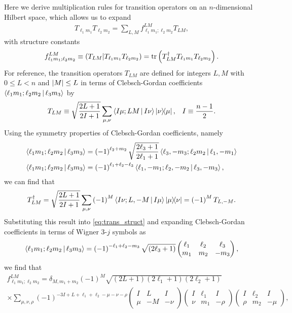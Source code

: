 \documentclass[nofootinbib,notitlepage,11pt]{revtex4-2}
\newcommand{\f}[2]{\dfrac{#1}{#2}} %
\newcommand{\p}[1]{\left(#1\right)} %
\newcommand{\bk}{\Braket} %
\newcommand{\1}{\mathds{1}}
\def\obk#1{\mathinner{({#1})}}
\begin{document}
Here we derive multiplication rules for transition operators on an $n$-dimensional Hilbert space, which allows us to expand
\begin{align}
  T_{\ell_1 m_1} T_{\ell_2 m_2}
  = \sum_{L,M} f_{\ell_1 m_1;\ell_2 m_2}^{LM} T_{LM},
\end{align}
with structure constants
\begin{align}
  f_{\ell_1 m_1;\ell_2 m_2}^{LM}
  \equiv \obk{T_{LM} | T_{\ell_1 m_1} T_{\ell_2 m_2}}
  = \tr\p{T_{LM}^\dag T_{\ell_1 m_1} T_{\ell_2 m_2}}.
  \label{eq:trans_struct}
\end{align}
For reference, the transition operators $T_{LM}$ are defined for
integers $L,M$ with $0\le L<n$ and $\abs{M}\le L$ in terms of
Clebsch-Gordan coefficients $\bk{\ell_1 m_1;\ell_2 m_2|\ell_3 m_3}$ by
\begin{align}
  T_{LM} \equiv \sqrt{\f{2L+1}{2I+1}}
  \sum_{\mu,\nu} \bk{I\mu;LM|I\nu} \op{\nu}{\mu},
  &&
  I \equiv \f{n-1}{2}.
\end{align}
Using the symmetry properties of Clebsch-Gordan coefficients, namely
\begin{align}
  \bk{\ell_1 m_1; \ell_2 m_2| \ell_3 m_3}
  &= \p{-1}^{\ell_2+m_2} \sqrt{\f{2\ell_3+1}{2\ell_1+1}}
  \bk{\ell_3,-m_3; \ell_2 m_2| \ell_1,-m_1} \\
  \bk{\ell_1 m_1; \ell_2 m_2| \ell_3 m_3}
  &= \p{-1}^{\ell_1+\ell_2-\ell_3}
  \bk{\ell_1,-m_1; \ell_2,-m_2| \ell_3,-m_3},
\end{align}
we can find that
\begin{align}
  T_{LM}^\dag
  = \sqrt{\f{2L+1}{2I+1}}
  \sum_{\mu,\nu} \p{-1}^M \bk{I\nu;L,-M|I\mu} \op{\mu}{\nu}
  = \p{-1}^M T_{L,-M}.
\end{align}
Substituting this result into \eqref{eq:trans_struct} and expanding
Clebsch-Gordan coefficients in terms of Wigner 3-$j$ symbols as
\begin{align}
  \bk{\ell_1 m_1; \ell_2 m_2| \ell_3 m_3}
  = \p{-1}^{-\ell_1+\ell_2-m_3} \sqrt{\p{2\ell_3+1}}
  \begin{pmatrix}
    \ell_1 & \ell_2 & \ell_3 \\
    m_1 & m_2 & -m_3
  \end{pmatrix},
\end{align}
we find that
\begin{multline}
  f_{\ell_1 m_1;\ell_2 m_2}^{LM}
  = \delta_{M,m_1+m_2}
  \p{-1}^M \sqrt{\p{2L+1}\p{2\ell_1+1}\p{2\ell_2+1}} \\
  \times \sum_{\mu,\nu,\rho} \p{-1}^{-3I+L+\ell_1+\ell_2-\mu-\nu-\rho}
  \begin{pmatrix}
    I & L & I \\
    \mu & -M & -\nu
  \end{pmatrix}
  \begin{pmatrix}
    I & \ell_1 & I \\
    \nu & m_1 & -\rho
  \end{pmatrix}
  \begin{pmatrix}
    I & \ell_2 & I \\
    \rho & m_2 & -\mu
  \end{pmatrix},
\end{multline}
\end{document}
